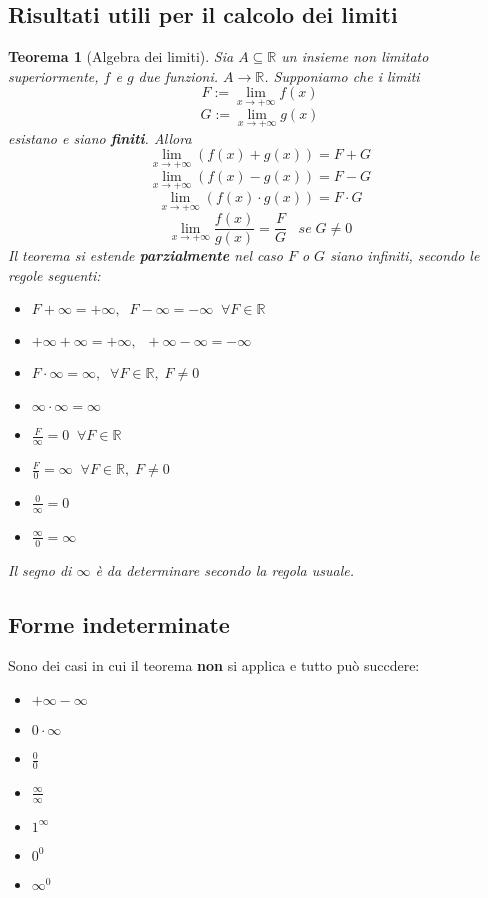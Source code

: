 \documentclass[a4paper]{article}
\newtheorem{theorem}{Teorema}
\theoremstyle{break}
\theoremstyle{break}
\theoremstyle{break}
\theoremstyle{break}
\begin{document}
\subsection{Risultati utili per il calcolo dei limiti}
\begin{theorem}[Algebra dei limiti]
  Sia \( A \subseteq \mathbb{R} \) un insieme non limitato superiormente, \( f \) e \( g \)
  due funzioni. \( A \to \mathbb{R} \). Supponiamo che i limiti
  \[
    F:= \lim_{x \to +\infty} f(x)
  \]
  \[
    G:= \lim_{x \to +\infty} g(x)
  \]
  esistano e siano \textbf{finiti}. Allora
  \[
    \lim_{x \to +\infty} (f(x) + g(x)) = F+G
  \]
  \[
    \lim_{x \to +\infty} (f(x) - g(x)) = F-G
  \]
  \[
    \lim_{x \to +\infty} (f(x) \cdot g(x)) = F \cdot G
  \]
  \[
    \lim_{x \to +\infty} \frac{f(x)}{g(x)} = \frac{F}{G}\;\;\;se\;G \neq 0
  \]
  Il teorema si estende \textbf{parzialmente} nel caso \( F \) o \( G \) siano infiniti, secondo
  le regole seguenti:
  \begin{itemize}
    \item \(
      F + \infty = +\infty,\;\; F - \infty = -\infty\;\; \forall F \in \mathbb{R}
      \)
    \item \(
      +\infty + \infty = +\infty,\;\; +\infty - \infty = -\infty
      \)
    \item \(
      F \cdot \infty = \infty, \;\; \forall F \in \mathbb{R},\; F \neq 0
      \)
    \item \(
      \infty \cdot \infty = \infty
      \)
    \item \(
      \frac{F}{\infty} = 0 \;\; \forall F \in \mathbb{R}
      \)
    \item \(
      \frac{F}{0} = \infty \;\; \forall F \in \mathbb{R},\; F \neq 0
      \)
    \item \(
      \frac{0}{\infty} = 0
      \)
    \item \(
      \frac{\infty}{0} = \infty
      \)
  \end{itemize}
  Il segno di \( \infty \) è da determinare secondo la regola usuale.
\end{theorem}


\subsection{Forme indeterminate}
Sono dei casi in cui il teorema \textbf{non} si applica e tutto può succdere:
\begin{itemize}
  \item \( +\infty - \infty \)
  \item \( 0 \cdot \infty \)
  \item \( \frac{0}{0} \)
  \item \( \frac{\infty}{\infty} \)
  \item \( 1^{\infty} \)
  \item \( 0^{0} \)
  \item \( \infty^{0} \)
\end{itemize}
\end{document}
